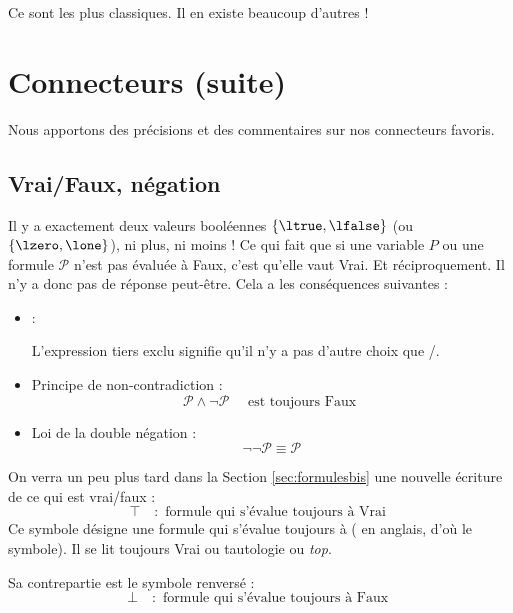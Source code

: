 \documentclass[11pt,class=report,crop=false]{standalone}
\begin{document}
\medskip

Ce sont les plus classiques. Il en existe beaucoup d'autres !



\section{Connecteurs (suite)}
\label{sec:connecteursbis}
Nous apportons des précisions et des commentaires sur nos connecteurs favoris.

\subsection{Vrai/Faux, négation}

Il y a exactement deux valeurs booléennes $\{\ltrue, \lfalse\}$ (ou $\{\lzero, \lone\}$), ni plus, ni moins ! Ce qui fait que si une variable $P$ ou une formule $\mathcal{P}$ n'est pas évaluée à Faux, c'est qu'elle vaut Vrai. Et réciproquement. Il n'y a donc pas de réponse \og{}peut-être\fg{}.
Cela a les conséquences suivantes :
\begin{itemize}
	\item {} :

L'expression \og{}tiers exclu\fg{} signifie qu'il n'y a pas d'autre choix que \ltrue/\lfalse.

	\item Principe de non-contradiction :
\[ \mathcal{P} \land \lnot \mathcal{P} \quad \text{ est toujours Faux } \]

	\item Loi de la double négation :
\[ \lnot\lnot \mathcal{P} \equiv \mathcal{P}\]
	
\end{itemize}

On verra un peu plus tard dans la Section \ref{sec:formulesbis} une nouvelle écriture de ce qui est vrai/faux :
\[ \top \quad : \text{ formule qui s'évalue toujours à Vrai }\]
Ce symbole désigne une formule qui s'évalue toujours à \ltrue{} (\ltruetrue{} en anglais, d'où le symbole). Il se lit \og{}toujours Vrai\fg{} ou \og{}tautologie\fg{} ou \emph{top}.

Sa contrepartie est le symbole renversé :
\[ \bot \quad : \text{ formule qui s'évalue toujours à Faux }\]
\end{document}
